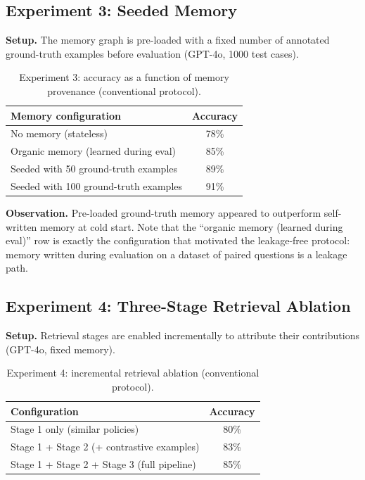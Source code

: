 \documentclass[12pt,a4paper]{report}
\begin{document}
\subsection{Experiment 3: Seeded Memory}

\textbf{Setup.} The memory graph is pre-loaded with a fixed number of annotated ground-truth examples before evaluation (GPT-4o, 1000 test cases).

\begin{table}[h]
\centering
\begin{tabular}{lc}
\toprule
Memory configuration & Accuracy \\
\midrule
No memory (stateless) & 78\% \\
Organic memory (learned during eval) & 85\% \\
Seeded with 50 ground-truth examples & 89\% \\
Seeded with 100 ground-truth examples & 91\% \\
\bottomrule
\end{tabular}
\caption{Experiment 3: accuracy as a function of memory provenance (conventional protocol).}
\end{table}

\textbf{Observation.} Pre-loaded ground-truth memory appeared to outperform self-written memory at cold start. Note that the ``organic memory (learned during eval)'' row is exactly the configuration that motivated the leakage-free protocol: memory written during evaluation on a dataset of paired questions is a leakage path.

\subsection{Experiment 4: Three-Stage Retrieval Ablation}

\textbf{Setup.} Retrieval stages are enabled incrementally to attribute their contributions (GPT-4o, fixed memory).

\begin{table}[h]
\centering
\begin{tabular}{lc}
\toprule
Configuration & Accuracy \\
\midrule
Stage 1 only (similar policies) & 80\% \\
Stage 1 + Stage 2 (+ contrastive examples) & 83\% \\
Stage 1 + Stage 2 + Stage 3 (full pipeline) & 85\% \\
\bottomrule
\end{tabular}
\caption{Experiment 4: incremental retrieval ablation (conventional protocol).}
\end{table}
\end{document}

